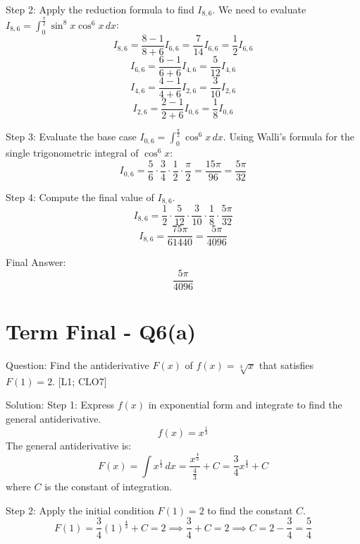 \documentclass[11pt, a4paper]{article}
\begin{document}
Step 2: Apply the reduction formula to find $I_{8, 6}$.
We need to evaluate $I_{8, 6} = \int_{0}^{\frac{\pi}{2}} \sin^8 x \cos^6 x \, dx$:
\[
I_{8, 6} = \frac{8-1}{8+6} I_{6, 6} = \frac{7}{14} I_{6, 6} = \frac{1}{2} I_{6, 6}
\]
\[
I_{6, 6} = \frac{6-1}{6+6} I_{4, 6} = \frac{5}{12} I_{4, 6}
\]
\[
I_{4, 6} = \frac{4-1}{4+6} I_{2, 6} = \frac{3}{10} I_{2, 6}
\]
\[
I_{2, 6} = \frac{2-1}{2+6} I_{0, 6} = \frac{1}{8} I_{0, 6}
\]

Step 3: Evaluate the base case $I_{0, 6} = \int_{0}^{\frac{\pi}{2}} \cos^6 x \, dx$.
Using Walli's formula for the single trigonometric integral of $\cos^6 x$:
\[
I_{0, 6} = \frac{5}{6} \cdot \frac{3}{4} \cdot \frac{1}{2} \cdot \frac{\pi}{2} = \frac{15\pi}{96} = \frac{5\pi}{32}
\]

Step 4: Compute the final value of $I_{8, 6}$.
\[
I_{8, 6} = \frac{1}{2} \cdot \frac{5}{12} \cdot \frac{3}{10} \cdot \frac{1}{8} \cdot \frac{5\pi}{32}
\]
\[
I_{8, 6} = \frac{75\pi}{61440} = \frac{5\pi}{4096}
\]

Final Answer:
\[
\boxed{\frac{5\pi}{4096}}
\]





\section*{Term Final - Q6(a)}

Question:
Find the antiderivative $F(x)$ of $f(x) = \sqrt[3]{x}$ that satisfies $F(1) = 2$. [L1; CLO7]

Solution:
Step 1: Express $f(x)$ in exponential form and integrate to find the general antiderivative.
\[
f(x) = x^{\frac{1}{3}}
\]
The general antiderivative is:
\[
F(x) = \int x^{\frac{1}{3}} \, dx = \frac{x^{\frac{4}{3}}}{\frac{4}{3}} + C = \frac{3}{4} x^{\frac{4}{3}} + C
\]
where $C$ is the constant of integration.

Step 2: Apply the initial condition $F(1) = 2$ to find the constant $C$.
\[
F(1) = \frac{3}{4}(1)^{\frac{4}{3}} + C = 2 \implies \frac{3}{4} + C = 2 \implies C = 2 - \frac{3}{4} = \frac{5}{4}
\]
\end{document}
